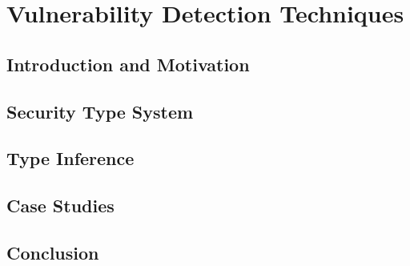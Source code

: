 
\chapter{Vulnerability Detection Techniques} \label{Chapter4}

\section{Introduction and Motivation}

\section{Security Type System}


\section{Type Inference}

\section{Case Studies}

\section{Conclusion}
